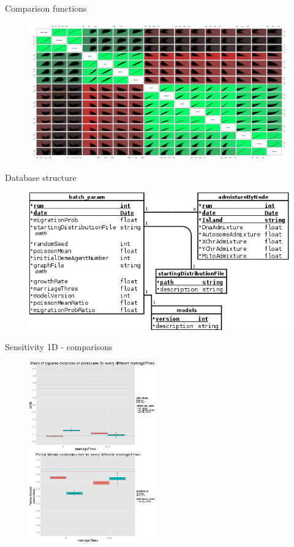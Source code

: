 \documentclass[10pt, aspectratio=43]{beamer}
\begin{document}
\begin{frame}{}{Comparison functions}
\begin{figure}
  \hspace*{-1cm}
  \includegraphics[width=1.17\textwidth]{../data/comparisonFunctions.png}
\end{figure}
\end{frame}

\begin{frame}{}{Database structure}
\begin{figure}
  \includegraphics[width=1\textwidth]{../data/DB.png}
\end{figure}
\end{frame}

\begin{frame}{}{Sensitivity 1D - comparisons}
\begin{figure}
  \includegraphics[width=0.48\textwidth]{../data/sensit-comp-1d.png}
\end{figure}
\end{frame}
\end{document}
